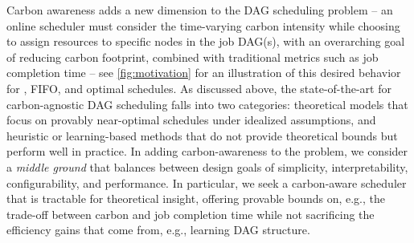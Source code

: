 Carbon awareness adds a new dimension to the DAG scheduling problem -- an online scheduler must consider the time-varying carbon intensity while choosing to assign resources to specific nodes in the job DAG(s), with an overarching goal of reducing carbon footprint, combined with traditional metrics such as job completion time -- see \autoref{fig:motivation} for an illustration of this desired behavior for \DANISH, FIFO, and optimal schedules.
As discussed above, the state-of-the-art for carbon-agnostic DAG scheduling falls into two categories: theoretical models that focus on provably near-optimal schedules under idealized assumptions, and heuristic or learning-based methods that do not provide theoretical bounds but perform well in practice.
In adding carbon-awareness to the problem, we consider a \textit{middle ground} that balances between design goals of simplicity, interpretability, configurability, and performance. 
In particular, we seek a carbon-aware scheduler that is tractable for theoretical insight, offering provable bounds on, e.g., the trade-off between carbon and job completion time while not sacrificing the efficiency gains that come from, e.g., learning DAG structure. 












